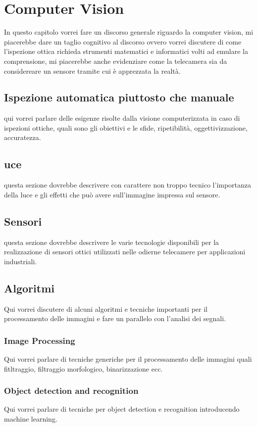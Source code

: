 \chapter{Computer Vision}

In questo capitolo vorrei fare un discorso generale riguardo la computer vision,
mi piacerebbe dare un taglio cognitivo al discorso ovvero vorrei discutere di come
l'ispezione ottica richieda strumenti matematici e informatici volti ad emulare
la comprensione, mi piacerebbe anche evidenziare come la telecamera sia da considereare
un sensore tramite cui è apprezzata la realtà.

\section{Ispezione automatica piuttosto che manuale}

qui vorrei parlare delle esigenze risolte dalla visione computerizzata in caso di
ispezioni ottiche, quali sono gli obiettivi e le sfide, ripetibilità, oggettivizzazione,
accuratezza.

\section{uce}

questa sezione dovrebbe descrivere con carattere non troppo tecnico l'importanza della luce
e gli effetti che può avere sull'immagine impressa sul sensore.

\section{Sensori}

questa sezione dovrebbe descrivere le varie tecnologie disponibili per la realizzazione di
sensori ottici utilizzati nelle odierne telecamere per applicazioni industriali.

\section{Algoritmi}
Qui vorrei discutere di alcuni algoritmi e tecniche importanti per il processamento delle immagini
e fare un parallelo con l'analisi dei segnali.

\subsection{Image Processing}
Qui vorrei parlare di tecniche generiche per il processamento delle immagini quali fitltraggio, filtraggio
morfologico, binarizzazione ecc.

\subsection{Object detection and recognition}	
Qui vorrei parlare di tecniche per object detection e recognition introducendo machine learning.

\endinput